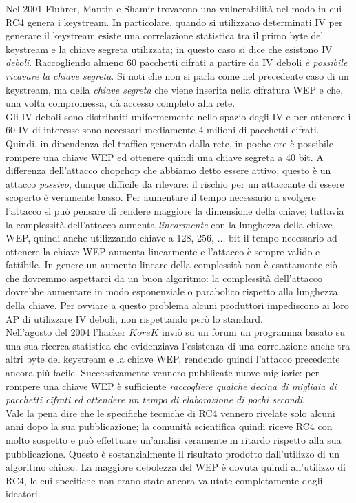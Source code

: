Nel 2001 Fluhrer, Mantin e Shamir trovarono una vulnerabilità nel modo in cui RC4 genera i keystream. In particolare, quando si utilizzano determinati IV per generare il keystream esiste una correlazione statistica tra il primo byte del keystream e la chiave segreta utilizzata; in questo caso si dice che esistono IV \textit{deboli}. Raccogliendo almeno 60 pacchetti cifrati a partire da IV deboli \textit{è possibile ricavare la chiave segreta}. Si noti che non si parla come nel precedente caso di un keystream, ma della \textit{chiave segreta} che viene inserita nella cifratura WEP e che, una volta compromessa, dà accesso completo alla rete.\\
Gli IV deboli sono distribuiti uniformemente nello spazio degli IV e per ottenere i 60 IV di interesse sono necessari mediamente 4 milioni di pacchetti cifrati. Quindi, in dipendenza del traffico generato dalla rete, in poche ore è possibile rompere una chiave WEP ed ottenere quindi una chiave segreta a 40 bit. A differenza dell'attacco chopchop che abbiamo detto essere attivo, questo è un attacco \textit{passivo}, dunque difficile da rilevare: il rischio per un attaccante di essere scoperto è veramente basso. Per aumentare il tempo necessario a svolgere l'attacco si può pensare di rendere maggiore la dimensione della chiave; tuttavia la complessità dell'attacco aumenta \textit{linearmente} con la lunghezza della chiave WEP, quindi anche utilizzando chiave a 128, 256, $\dots$ bit il tempo necessario ad ottenere la chiave WEP aumenta linearmente e l'attacco è sempre valido e fattibile. In genere un aumento lineare della complessità non è esattamente ciò che dovremmo aspettarci da un buon algoritmo: la complessità dell'attacco dovrebbe aumentare in modo esponenziale o parabolico rispetto alla lunghezza della chiave. Per ovviare a questo problema alcuni produttori impediscono ai loro AP di utilizzare IV deboli, non rispettando però lo standard.\\
Nell'agosto del 2004 l'hacker $KoreK$ inviò su un forum un programma basato su una sua ricerca statistica che evidenziava l'esistenza di una correlazione anche tra altri byte del keystream e la chiave WEP, rendendo quindi l'attacco precedente ancora più facile. Successivamente vennero pubblicate nuove migliorie: per rompere una chiave WEP è sufficiente \textit{raccogliere qualche decina di migliaia di pacchetti cifrati ed attendere un tempo di elaborazione di pochi secondi}.\\
Vale la pena dire che le specifiche tecniche di RC4 vennero rivelate solo alcuni anni dopo la sua pubblicazione; la comunità scientifica quindi riceve RC4 con molto sospetto e può effettuare un'analisi veramente in ritardo rispetto alla sua pubblicazione. Questo è sostanzialmente il risultato prodotto dall'utilizzo di un algoritmo chiuso. La maggiore debolezza del WEP è dovuta quindi all'utilizzo di RC4, le cui specifiche non erano state ancora valutate completamente dagli ideatori.

